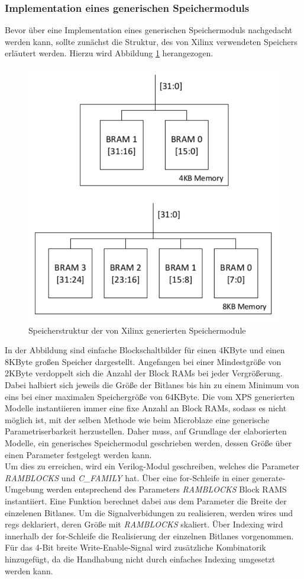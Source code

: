 \subsubsection{Implementation eines generischen Speichermoduls} \label{subsubsec:genMem}
Bevor über eine Implementation eines generischen Speichermoduls nachgedacht werden kann, sollte zunächst die Struktur, des von Xilinx verwendeten Speichers erläutert werden. Hierzu wird Abbildung \ref{fig:XilinxMEM} herangezogen.
\begin{figure}[ht!]
\centering
\includegraphics[width=0.7\linewidth]{./bilder/XilinxMEM}
\caption{Speicherstruktur der von Xilinx generierten Speichermodule}
\label{fig:XilinxMEM}
\end{figure}
In der Abbildung sind einfache Blockschaltbilder für einen 4KByte und einen 8KByte großen Speicher dargestellt. Angefangen bei einer Mindestgröße von 2KByte verdoppelt sich die Anzahl der Block RAMs bei jeder Vergrößerung. Dabei halbiert sich jeweils die Größe der Bitlanes bis hin zu einem Minimum von eins bei einer maximalen Speichergröße von 64KByte. Die vom XPS generierten Modelle instantiieren immer eine fixe Anzahl an Block RAMs, sodass es nicht möglich ist, mit der selben Methode wie beim Microblaze eine generische Parametriserbarkeit herzustellen. Daher muss, auf Grundlage der elaborierten Modelle, ein generisches Speichermodul geschrieben werden, dessen Größe über einen Parameter festgelegt werden kann.\\
Um dies zu erreichen, wird ein Verilog-Modul geschreiben, welches die Parameter \textit{RAMBLOCKS} und \textit{C\_FAMILY} hat. Über eine for-Schleife in einer generate-Umgebung werden entsprechend des Parameters \textit{RAMBLOCKS} Block RAMS instantiiert. Eine Funktion berechnet dabei aus dem Parameter die Breite der einzelenen Bitlanes. Um die Signalverbidungen zu realisieren, werden wires und regs deklariert, deren Größe mit \textit{RAMBLOCKS} skaliert. Über Indexing wird innerhalb der for-Schleife die Realisierung der einzelnen Bitlanes vorgenommen. Für das 4-Bit breite Write-Enable-Signal wird zusätzliche Kombinatorik hinzugefügt, da die Handhabung nicht durch einfaches Indexing umgesetzt werden kann.

